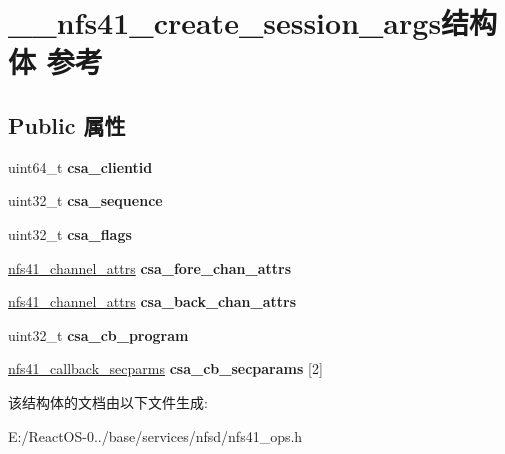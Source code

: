 \hypertarget{struct____nfs41__create__session__args}{}\section{\+\_\+\+\_\+nfs41\+\_\+create\+\_\+session\+\_\+args结构体 参考}
\label{struct____nfs41__create__session__args}
\subsection*{Public 属性}
\begin{DoxyCompactItemize}
\item 
\mbox{\label{struct____nfs41__create__session__args_abfa93056621fc88b4d8f95ae84df85c4}} 
uint64\+\_\+t {\bfseries csa\+\_\+clientid}
\item 
\mbox{\label{struct____nfs41__create__session__args_a83fc2dead3022e208d992d4083484129}} 
uint32\+\_\+t {\bfseries csa\+\_\+sequence}
\item 
\mbox{\label{struct____nfs41__create__session__args_a6afdb6c9300697b2cd8c45edbc56fe51}} 
uint32\+\_\+t {\bfseries csa\+\_\+flags}
\item 
\mbox{\label{struct____nfs41__create__session__args_a771139363a9a5e12a1e99dbb3ae105e6}} 
\hyperlink{struct____nfs41__channel__attrs}{nfs41\+\_\+channel\+\_\+attrs} {\bfseries csa\+\_\+fore\+\_\+chan\+\_\+attrs}
\item 
\mbox{\label{struct____nfs41__create__session__args_a48afc76f5f27dd7782983d36ca4f9d21}} 
\hyperlink{struct____nfs41__channel__attrs}{nfs41\+\_\+channel\+\_\+attrs} {\bfseries csa\+\_\+back\+\_\+chan\+\_\+attrs}
\item 
\mbox{\label{struct____nfs41__create__session__args_afc9fd369726b1b27b376dbf4630a31ca}} 
uint32\+\_\+t {\bfseries csa\+\_\+cb\+\_\+program}
\item 
\mbox{\label{struct____nfs41__create__session__args_a599acd13c14f21abd09a836094b0f3b1}} 
\hyperlink{struct____nfs41__callback__sec__parms}{nfs41\+\_\+callback\+\_\+secparms} {\bfseries csa\+\_\+cb\+\_\+secparams} \mbox{[}2\mbox{]}
\end{DoxyCompactItemize}


该结构体的文档由以下文件生成\+:\begin{DoxyCompactItemize}
\item 
E\+:/\+React\+O\+S-\/0../base/services/nfsd/nfs41\+\_\+ops.\+h\end{DoxyCompactItemize}
